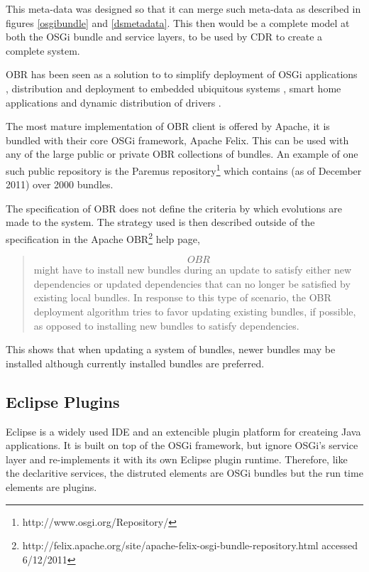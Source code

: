 This meta-data was designed so that it can merge such meta-data as described in figures \ref{osgibundle} and \ref{dsmetadata}.
This then would be a complete model at both the OSGi bundle and service layers, to be used by CDR to create a complete system. 

OBR has been seen as a solution to to simplify deployment of OSGi applications \cite{jung_integrating_2007}, 
distribution and deployment to embedded ubiquitous systems \cite{jung_embedded_2006}, 
smart home applications \cite{gouin-vallerand_managing_2007} and 
dynamic distribution of drivers \cite{kriens_osgi_2008}. 

The most mature implementation of OBR client is offered by Apache, it is bundled with their core OSGi framework, Apache Felix. 
This can be used with any of the large public or private OBR collections of bundles.
An example of one such public repository is the Paremus repository\footnote{http://www.osgi.org/Repository/} which contains (as of December 2011) over 2000 bundles.

The specification of OBR does not define the criteria by which evolutions are made to the system.
The strategy used is then described outside of the specification in the Apache OBR\footnote{http://felix.apache.org/site/apache-felix-osgi-bundle-repository.html accessed 6/12/2011} help page,

\begin{quotation}
\[OBR\] might have to install new bundles during an update to satisfy either new dependencies or updated dependencies that can no longer be satisfied by existing local bundles. 
In response to this type of scenario, the OBR deployment algorithm tries to favor updating existing bundles, if possible, as opposed to installing new bundles to satisfy dependencies.
\end{quotation}

This shows that when updating a system of bundles, newer bundles may be installed although currently installed bundles are preferred.

\subsection{Eclipse Plugins}
Eclipse is a widely used IDE and an extencible plugin platform for createing Java applications.
It is built on top of the OSGi framework, but ignore OSGi's service layer and re-implements it with its own Eclipse plugin runtime.
Therefore, like the declaritive services, the distruted elements are OSGi bundles but the run time elements are plugins.


